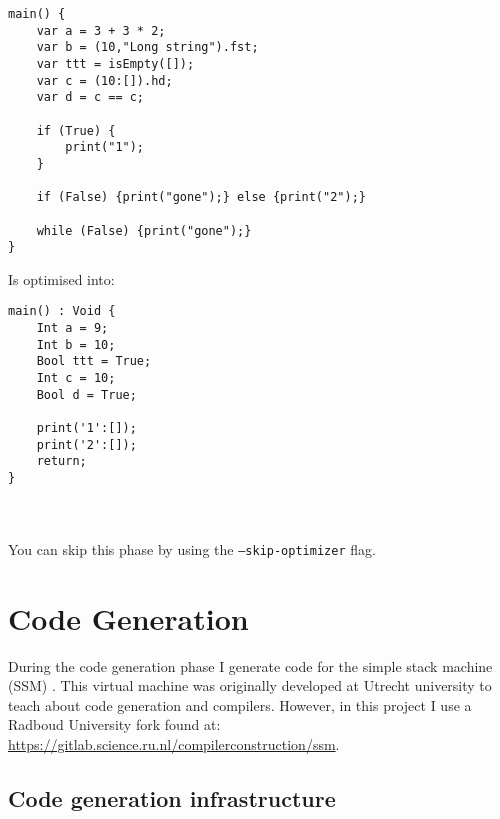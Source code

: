 \documentclass{report}
\begin{document}
\begin{lstlisting}[style=SPL]
main() {
    var a = 3 + 3 * 2;
    var b = (10,"Long string").fst;
    var ttt = isEmpty([]);
    var c = (10:[]).hd;
    var d = c == c;
    
    if (True) {
        print("1");
    } 
    
    if (False) {print("gone");} else {print("2");}

    while (False) {print("gone");} 
}
\end{lstlisting}

Is optimised into:

\begin{lstlisting}[style=SPL]
main() : Void {
    Int a = 9;
    Int b = 10;
    Bool ttt = True;
    Int c = 10;
    Bool d = True; 
    
    print('1':[]);
    print('2':[]);
    return;
}
\end{lstlisting}


\\\\
\noindent You can skip this phase by using the \texttt{--skip-optimizer} flag.






\chapter{Code Generation}

During the code generation phase I generate code for the simple stack machine (SSM) \cite{SimpleStackMachine}. 
This virtual machine was originally developed at Utrecht university to teach about code generation and compilers. However, in this project I use a Radboud University fork found at: \url{https://gitlab.science.ru.nl/compilerconstruction/ssm}.
 
\section{Code generation infrastructure}
\end{document}
